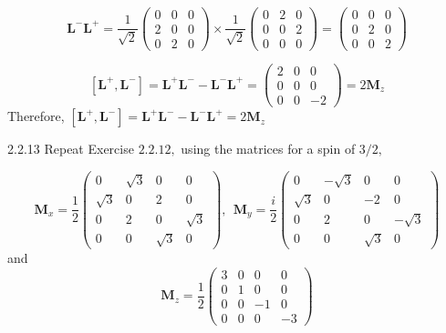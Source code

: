 \documentclass{article}
\begin{document}
\begin{flushleft}
$$
\mathbf{L}^{-} \mathbf{L}^{+}=\frac{1}{\sqrt{2}}\left(\begin{array}{lll}
0 & 0 & 0 \\
2 & 0 & 0 \\
0 & 2 & 0
\end{array}\right) \times \frac{1}{\sqrt{2}}\left(\begin{array}{lll}
0 & 2 & 0 \\
0 & 0 & 2 \\
0 & 0 & 0
\end{array}\right)=\left(\begin{array}{lll}
0 & 0 & 0 \\
0 & 2 & 0 \\
0 & 0 & 2
\end{array}\right)
$$

$$
\left[\mathbf{L}^{+}, \mathbf{L}^{-}\right]=\mathbf{L}^{+} \mathbf{L}^{-}-\mathbf{L}^{-} \mathbf{L}^{+}=\left(\begin{array}{ccc}
2 & 0 & 0 \\
0 & 0 & 0 \\
0 & 0 & -2
\end{array}\right)=2 \mathbf{M}_{z}
$$
Therefore, $\left[\mathbf{L}^{+}, \mathbf{L}^{-}\right]=\mathbf{L}^{+} \mathbf{L}^{-}-\mathbf{L}^{-} \mathbf{L}^{+}=2 \mathbf{M}_{z}$








\newpage



\begin{mybox}{2.2.13}
Repeat Exercise $2.2 .12,$ using the matrices for a spin of $3 / 2,$

$$
\mathbf{M}_{x}=\frac{1}{2}\left(\begin{array}{cccc}
0 & \sqrt{3} & 0 & 0 \\
\sqrt{3} & 0 & 2 & 0 \\
0 & 2 & 0 & \sqrt{3} \\
0 & 0 & \sqrt{3} & 0
\end{array}\right), \ \ \mathbf{M}_{y}=\frac{i}{2}\left(\begin{array}{cccc}
0 & -\sqrt{3} & 0 & 0 \\
\sqrt{3} & 0 & -2 & 0 \\
0 & 2 & 0 & -\sqrt{3} \\
0 & 0 & \sqrt{3} & 0
\end{array}\right)
$$
and
$$
\mathbf{M}_{z}=\frac{1}{2}\left(\begin{array}{rrrr}
3 & 0 & 0 & 0 \\
0 & 1 & 0 & 0 \\
0 & 0 & -1 & 0 \\
0 & 0 & 0 & -3
\end{array}\right)
$$
\end{mybox}



\end{flushleft}
\end{document}
